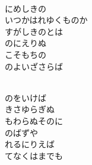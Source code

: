 \documentclass[10pt,b5j]{tarticle} %
\begin{document}
\vspace{1.5em} %
\newcommand{\linespace}{0.5em} %
\newcommand{\blocksize}{0.5\hsize} %
\newcommand{\itemmargin}{3em} %
\begin{enumerate} %
    \setlength{\itemindent}{\itemmargin} %
    \begin{minipage}[c]{\blocksize}
    
        \vspace{\linespace}
        \item~\\
        にめしきの\\
        いつかはれゆくものか\\
        すがしきのとは\\
        のにえりぬ\\
        こそもちの\\
        のよいざさらば
        
    \end{minipage}
    \begin{minipage}[c]{\blocksize}
        
        \vspace{\linespace}
        \item~\\
        のをいけば\\
        きさゆらぎぬ\\
        もわらぬそのに\\
        のばずや\\
        れるにりえば\\
        てなくはまでも
        
    \end{minipage}
    \begin{minipage}[c]{\blocksize}
        

\end{minipage}
\end{enumerate}
\end{document}
